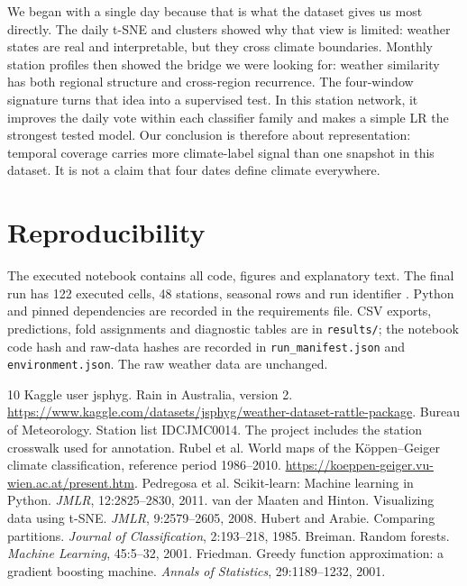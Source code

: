 \documentclass{article}
\begin{document}
We began with a single day because that is what the dataset gives us most directly. The daily t-SNE and clusters showed why that view is limited: weather states are real and interpretable, but they cross climate boundaries. Monthly station profiles then showed the bridge we were looking for: weather similarity has both regional structure and cross-region recurrence. The four-window signature turns that idea into a supervised test. In this station network, it improves the daily vote within each classifier family and makes a simple LR the strongest tested model. Our conclusion is therefore about representation: temporal coverage carries more climate-label signal than one snapshot in this dataset. It is not a claim that four dates define climate everywhere.

\section*{Reproducibility}
The executed notebook contains all code, figures and explanatory text. The final run has 122 executed cells, 48 stations, \SeasonRows{} seasonal rows and run identifier \texttt{\RunID}. Python \PythonVersion{} and pinned dependencies are recorded in the requirements file. CSV exports, predictions, fold assignments and diagnostic tables are in \texttt{results/}; the notebook code hash and raw-data hashes are recorded in \texttt{run\_manifest.json} and \texttt{environment.json}. The raw weather data are unchanged.

\clearpage
\begin{thebibliography}{10}\small
{} Kaggle user jsphyg. Rain in Australia, version 2. \url{https://www.kaggle.com/datasets/jsphyg/weather-dataset-rattle-package}.
 Bureau of Meteorology. Station list IDCJMC0014. The project includes the station crosswalk used for annotation.
 Rubel et al. World maps of the Köppen--Geiger climate classification, reference period 1986--2010. \url{https://koeppen-geiger.vu-wien.ac.at/present.htm}.
 Pedregosa et al. Scikit-learn: Machine learning in Python. \emph{JMLR}, 12:2825--2830, 2011.
 van der Maaten and Hinton. Visualizing data using t-SNE. \emph{JMLR}, 9:2579--2605, 2008.
 Hubert and Arabie. Comparing partitions. \emph{Journal of Classification}, 2:193--218, 1985.
 Breiman. Random forests. \emph{Machine Learning}, 45:5--32, 2001.
 Friedman. Greedy function approximation: a gradient boosting machine. \emph{Annals of Statistics}, 29:1189--1232, 2001.
\end{thebibliography}
\end{document}
